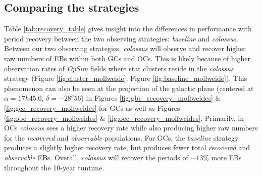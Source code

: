 \documentclass[twocolumn]{aastex63}
\begin{document}
\subsection{Comparing the strategies}
Table \ref{tab:recovery_table} gives insight into the differences in performance with period recovery between the two observing strategies: \textit{baseline} and \textit{colossus}. Between our two observing strategies, \textit{colossus} will observe and recover higher raw numbers of EBs within both GCs and OCs. This is likely because of higher observation rates of \textit{OpSim} fields where star clusters reside in the \textit{colossus} strategy (Figure \ref{fig:cluster_mollweide}, Figure \ref{fig:baseline_mollweide}). This phenomenon can also be seen at the projection of the galactic plane (centered at $\alpha = 17h 45.0$, $\delta = -28^o 56$) in Figures \ref{fig:gbc_recovery_mollweides} \& \ref{fig:gcc_recovery_mollweides} for GCs as well as Figures \ref{fig:obc_recovery_mollweides} \& \ref{fig:occ_recovery_mollweides}. Primarily, in OCs \textit{colossus} sees a higher recovery rate while also producing higher raw numbers for the \textit{recovered} and \textit{observable} populations. For GCs, the \textit{baseline} strategy produces a slightly higher recovery rate, but produces fewer total \textit{recovered} and \textit{observable} EBs. Overall, \textit{colossus} will recover the periods of $\sim 13\%$ more EBs  throughout the 10-year tuntime.

\end{document}
